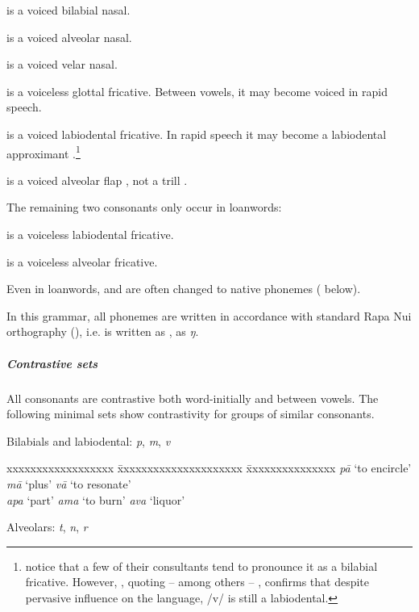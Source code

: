  is a voiced bilabial nasal.

 is a voiced alveolar nasal.

 is a voiced velar nasal. 

 is a voiceless glottal fricative. Between vowels, it may become voiced in rapid speech.

 is a voiced labiodental fricative. In rapid speech it may become a labiodental approximant \textstyleIPA{[ʋ]}.\footnote{\label{fn:31}\citet[14]{GuerraEissmann1993} notice that a few of their consultants tend to pronounce it as a bilabial fricative. However, \citet[317–318]{Fischer2001Hispan}, quoting – among others – \citet{WeberWeber1982}, confirms that despite pervasive  influence on the language, /v/ is still a labiodental.}

 is a voiced alveolar flap \textstyleIPA{[ɾ]}, not a trill \textstyleIPA{[r]}.

The remaining two consonants only occur in loanwords: 

 is a voiceless labiodental fricative. 

 is a voiceless alveolar fricative. 

Even in loanwords,  and  are often changed to native phonemes ( below).

In this grammar, all phonemes are written in accordance with standard Rapa Nui orthography (), i.e.  is written as \textit{{\ꞌ}},  as \textit{ŋ}.

\subparagraph{Contrastive sets} All consonants are contrastive both word-initially and between vowels. The following minimal sets show contrastivity for groups of similar consonants.

\newpage 
Bilabials and labiodental: \textit{p}, \textit{m}, \textit{v}

\ea
\begin{tabbing}
 xxxxxxxxxxxxxxxxxx \= xxxxxxxxxxxxxxxxxxxxx \= xxxxxxxxxxxxxxx \kill
 \textit{pā} ‘to encircle’  \> \textit{mā} ‘plus’  \> \textit{vā} ‘to resonate’\\
 \textit{{\ꞌ}apa} ‘part’  \> \textit{{\ꞌ}ama} ‘to burn’ \>  \textit{{\ꞌ}ava} ‘liquor’
\end{tabbing}
\z 
Alveolars: \textit{t}, \textit{n}, \textit{r}

